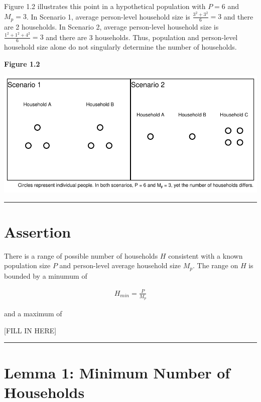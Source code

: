\documentclass[
]{article}
\begin{document}
Figure 1.2 illustrates this point in a hypothetical population with
\(P = 6\) and \(M_p = 3\). In Scenario 1, average person-level household
size is \(\frac{3^2 + 3^2}{6} = 3\) and there are 2 households. In
Scenario 2, average person-level household size is
\(\frac{1^2 + 1^2 + 4^2}{6} = 3\) and there are 3 households. Thus,
population and person-level household size alone do not singularly
determine the number of households.

\textbf{Figure 1.2}

\includegraphics[width=1\linewidth]{proof_files/figure-latex/unnamed-chunk-1-1}

\begin{center}\rule{0.5\linewidth}{0.5pt}\end{center}

\hypertarget{assertion}{%
\section{Assertion}\label{assertion}}

There is a range of possible number of households \(H\) consistent with
a known population size \(P\) and person-level average household size
\(M_p\). The range on \(H\) is bounded by a minumum of

\begin{align}
H_{min} = \frac{P}{M_p}
\end{align}

and a maximum of

{[}FILL IN HERE{]}

\begin{center}\rule{0.5\linewidth}{0.5pt}\end{center}

\hypertarget{lemma-1-minimum-number-of-households}{%
\section{Lemma 1: Minimum Number of
Households}\label{lemma-1-minimum-number-of-households}}
\end{document}
